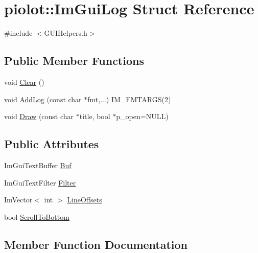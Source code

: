 \hypertarget{structpiolot_1_1_im_gui_log}{}\section{piolot\+:\+:Im\+Gui\+Log Struct Reference}
\label{structpiolot_1_1_im_gui_log}


{\ttfamily \#include $<$G\+U\+I\+Helpers.\+h$>$}

\subsection*{Public Member Functions}
\begin{DoxyCompactItemize}
\item 
void \mbox{\hyperlink{structpiolot_1_1_im_gui_log_ac7812f01c1da335a594a88e9b5d417f5}{Clear}} ()
\item 
void \mbox{\hyperlink{structpiolot_1_1_im_gui_log_a29f527cccbe3946d24c8098ccf871699}{Add\+Log}} (const char $\ast$fmt,...) I\+M\+\_\+\+F\+M\+T\+A\+R\+GS(2)
\item 
void \mbox{\hyperlink{structpiolot_1_1_im_gui_log_adaab8c65a0a76e8b434ae0edc4834a36}{Draw}} (const char $\ast$title, bool $\ast$p\+\_\+open=N\+U\+LL)
\end{DoxyCompactItemize}
\subsection*{Public Attributes}
\begin{DoxyCompactItemize}
\item 
Im\+Gui\+Text\+Buffer \mbox{\hyperlink{structpiolot_1_1_im_gui_log_a0e64a8554125f6a918016325996c8a28}{Buf}}
\item 
Im\+Gui\+Text\+Filter \mbox{\hyperlink{structpiolot_1_1_im_gui_log_a2649c271372b11fbf1f8fd5ebdec6055}{Filter}}
\item 
Im\+Vector$<$ int $>$ \mbox{\hyperlink{structpiolot_1_1_im_gui_log_a8c942c870cf5599fee50d7d7d30152b0}{Line\+Offsets}}
\item 
bool \mbox{\hyperlink{structpiolot_1_1_im_gui_log_ae6efe1280bb054ee0651ad47251f4457}{Scroll\+To\+Bottom}}
\end{DoxyCompactItemize}


\subsection{Member Function Documentation}
\mbox{\label{structpiolot_1_1_im_gui_log_a29f527cccbe3946d24c8098ccf871699}} 
